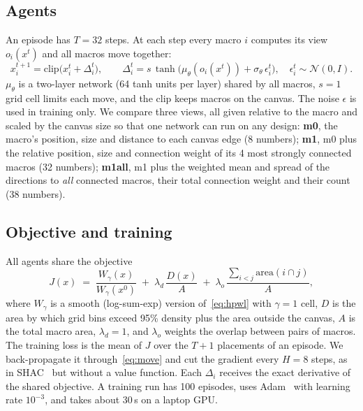 \documentclass[10pt]{article}
\begin{document}
\subsection{Agents}
An episode has $T=32$ steps. At each step every macro $i$ computes its view $o_i(x^t)$ and all macros move together:
\begin{equation}
x_i^{t+1} = \mathrm{clip}\big(x_i^t + \Delta_i^t\big),\qquad \Delta_i^t = s\,\tanh\!\big(\mu_\theta(o_i(x^t)) + \sigma_\theta\,\epsilon_i^t\big),\quad \epsilon_i^t\sim\mathcal{N}(0,I).
\label{eq:move}
\end{equation}
$\mu_\theta$ is a two-layer network (64 tanh units per layer) shared by all macros, $s=1$ grid cell limits each move, and the clip keeps macros on the canvas. The noise $\epsilon$ is used in training only. We compare three views, all given relative to the macro and scaled by the canvas size so that one network can run on any design:
\textbf{m0}, the macro's position, size and distance to each canvas edge (8 numbers);
\textbf{m1}, m0 plus the relative position, size and connection weight of its 4 most strongly connected macros (32 numbers);
\textbf{m1all}, m1 plus the weighted mean and spread of the directions to \emph{all} connected macros, their total connection weight and their count (38 numbers).

\subsection{Objective and training}
All agents share the objective
\begin{equation}
J(x) \;=\; \frac{W_\gamma(x)}{W_\gamma(x^0)} \;+\; \lambda_d\,\frac{D(x)}{A} \;+\; \lambda_o\,\frac{\sum_{i<j}\mathrm{area}(i\cap j)}{A},
\label{eq:objective}
\end{equation}
where $W_\gamma$ is a smooth (log-sum-exp) version of~\eqref{eq:hpwl} with $\gamma=1$ cell, $D$ is the area by which grid bins exceed 95\% density plus the area outside the canvas, $A$ is the total macro area, $\lambda_d=1$, and $\lambda_o$ weights the overlap between pairs of macros. The training loss is the mean of $J$ over the $T{+}1$ placements of an episode. We back-propagate it through~\eqref{eq:move} and cut the gradient every $H=8$ steps, as in SHAC~\citep{xu2022shac} but without a value function. Each $\Delta_i$ receives the exact derivative of the shared objective. A training run has 100 episodes, uses Adam~\citep{kingma2015adam} with learning rate $10^{-3}$, and takes about 30\,s on a laptop GPU.
\end{document}
